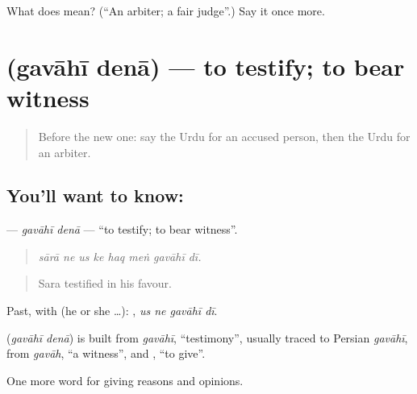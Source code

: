 \begin{tcolorbox}[breakable,colback=teal!4,colframe=teal!35!black,title={Before you move on}]
What does  mean? (\textquotedblleft{}An arbiter; a fair judge\textquotedblright{}.) Say it once more.
\end{tcolorbox}
\section[\texorpdfstring{\ur{گواہی} \ur{دینا} (gavāhī denā)}{گواہی دینا (gavāhī denā)}]{  (gavāhī denā) — to testify; to bear witness}

\label{lesson:UR-C340-gavahi-dena}



\begin{quote}
Before the new one: say the Urdu for an accused person, then the Urdu for an arbiter.
\end{quote}

\subsection*{You'll want to know:  }
\textbf{ } — \emph{gavāhī denā} — \textquotedblleft{}to testify; to bear witness\textquotedblright{}.

\begin{quote}
       
\end{quote}

\begin{quote}
\emph{sārā ne us ke haq meṅ gavāhī dī.}
\end{quote}

\begin{quote}
Sara testified in his favour.
\end{quote}

Past, with  (he or she …):    , \emph{us ne gavāhī dī}.

\begin{cousinweb}
\textbf{ } (\emph{gavāhī denā}) is built from \emph{gavāhī}, \textquotedblleft{}testimony\textquotedblright{}, usually traced to Persian \emph{gavāhī}, from \emph{gavāh}, \textquotedblleft{}a witness\textquotedblright{}, and \textbf{}, \textquotedblleft{}to give\textquotedblright{}.
\end{cousinweb}

\begin{grammarlens}[title={What you've built}]
One more word for giving reasons and opinions.
\end{grammarlens}

